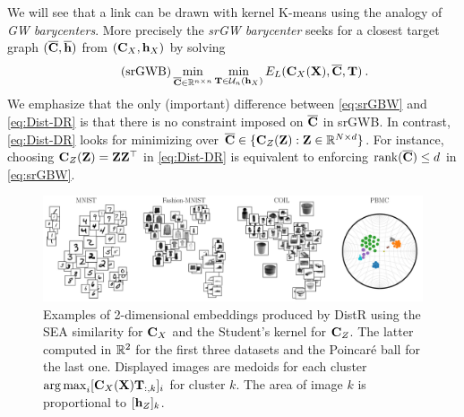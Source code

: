 We will see that a link can be drawn with kernel K-means using the analogy of \emph{GW barycenters}. More precisely the \emph{srGW barycenter} \cite{vincent2021semi} seeks for a closest target graph $(\overline{{\mathbf{C}}}, \overline{{\mathbf{h}}})$ from $({\mathbf{C}}_X, {\mathbf{h}}_X)$ by solving
\begin{equation}\tag{srGWB}\label{eq:srGBW}
	\min_{\overline{{\mathbf{C}}} \in \mathbb{R}^{n \times n}} \min_{{\mathbf{T}} \in \mathcal{U}_n({\mathbf{h}}_X)} E_L({\mathbf{C}}_{X}({\mathbf{X}}), \overline{{\mathbf{C}}}, {\mathbf{T}}) \:.
\end{equation} 
We emphasize that the only (important) difference between \cref{eq:srGBW} and
\cref{eq:Dist-DR} is that there is no constraint imposed on $\overline{{\mathbf{C}}}$ in
srGWB. In contrast, \cref{eq:Dist-DR} looks for minimizing over $\overline{{\mathbf{C}}}
\in \{{\mathbf{C}}_{Z}({\mathbf{Z}}): {\mathbf{Z}} \in \mathbb{R}^{N \times d}\}$. For instance, choosing ${\mathbf{C}}_{Z}({\mathbf{Z}}) = {\mathbf{Z}} {\mathbf{Z}}^\top$ in \cref{eq:Dist-DR} is
equivalent to enforcing $\operatorname{rank}(\overline{{\mathbf{C}}}) \leq d$ in
\cref{eq:srGBW}.
\begin{figure}[t!]
	\begin{center}
		\centerline{\includegraphics[width=\columnwidth]{figures/DistR/DistDR_embed.pdf}}
		\caption{Examples of 2-dimensional embeddings produced by DistR using the SEA similarity for ${\mathbf{C}}_{X}$ 
		and the Student's kernel for ${\mathbf{C}}_{Z}$. The latter computed in $\mathbb{R}^2$ for the first three datasets and the Poincaré ball for the last one.
		Displayed images are medoids for each cluster \ie $\operatorname*{arg\,max}_i [{\mathbf{C}}_X({\mathbf{X}}){\mathbf{T}}_{:,k}]_i$ for cluster $k$. The area of image $k$ is proportional to $[{\mathbf{h}}_Z]_k$.
		}
		\label{fig:visu_gwdr}
	\end{center}
	\vspace{-0.8cm}
\end{figure}

